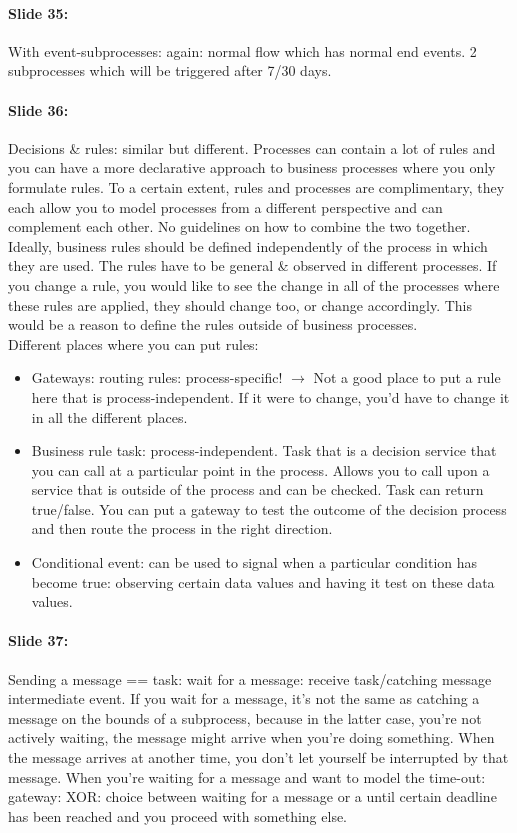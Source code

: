 \documentclass[10pt,a4paper]{report}
\begin{document}
\paragraph{Slide 35:}With event-subprocesses: again: normal flow which has normal end events. 2 subprocesses which will be triggered after 7/30 days.

\paragraph{Slide 36:}Decisions \& rules: similar but different. Processes can contain a lot of rules and you can have a more declarative approach to business processes where you only formulate rules. To a certain extent, rules and processes are complimentary, they each allow you to model processes from a different perspective and can complement each other. No guidelines on how to combine the two together.\\
Ideally, business rules should be defined independently of the process in which they are used. The rules have to be general \& observed in different processes. If you change a rule, you would like to see the change in all of the processes where these rules are applied, they should change too, or change accordingly. This would be a reason to define the rules outside of business processes.\\
Different places where you can put rules:
\begin{itemize} 
\item Gateways: routing rules: process-specific! $\rightarrow$ Not a good place to put a rule here that is process-independent. If it were to change, you'd have to change it in all the different places.
\item Business rule task: process-independent. Task that is a decision service that you can call at a particular point in the process. Allows you to call upon a service that is outside of the process and can be checked. Task can return true/false. You can put a gateway to test the outcome of the decision process and then route the process in the right direction.
\item Conditional event: can be used to signal when a particular condition has become true: observing certain data values and having it test on these data values.
\end{itemize}

\paragraph{Slide 37:}Sending a message == task: wait for a message: receive task/catching message intermediate event. If you wait for a message, it's not the same as catching a message on the bounds of a subprocess, because in the latter case, you're not actively waiting, the message might arrive when you're doing something. When the message arrives at another time, you don't let yourself be interrupted by that message. When you're waiting for a message and want to model the time-out: gateway: XOR: choice between waiting for a message or a until certain deadline has been reached and you proceed with something else.
\end{document}
